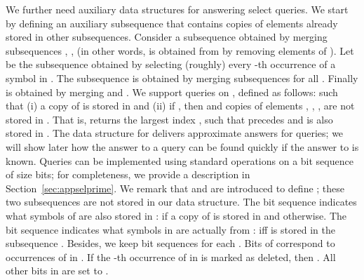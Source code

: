 \documentclass[11pt]{article}\usepackage{fullpage}
\begin{document}
We further need  auxiliary data structures for answering 
select queries. We start by defining an auxiliary subsequence  that contains copies of elements already stored in other subsequences.  
Consider a subsequence  obtained by merging subsequences , ,  (in other words,  is obtained from  by removing elements of ). 
Let  be the subsequence obtained by selecting (roughly) every -th occurrence of a symbol  in . 
The subsequence  is obtained by merging  subsequences  for all .  
Finally  is obtained  by merging  and .  
 We support queries  on , defined as follows:  such that (i) a copy of  is stored in  and (ii) if , then  and copies of elements , , ,  are not stored in . That is,  returns the largest index  , such that   precedes  and  is also stored in . The data structure for  delivers approximate 
answers for  queries; we will show later how the answer to a query  can be found quickly if the answer to  is known. Queries  can be implemented using standard operations on a bit sequence of size   bits; for completeness, we provide a description in Section~\ref{sec:appselprime}.  
We remark that  and  are introduced to define ; these two subsequences are not stored in our data structure. 
The bit sequence  indicates what symbols of  are also stored in :
 if a copy of  is stored in  and  otherwise. 
The bit sequence  indicates what symbols in  are actually from :  iff  is stored in the subsequence . 
Besides, we keep bit sequences  for each . Bits of  correspond to occurrences of  in . 
If the -th occurrence of  in  is marked as deleted, 
then . All other bits in  are set to .
\end{document}
